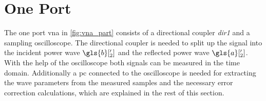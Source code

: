 \documentclass[12pt,a4paper,parskip=full,abstract=true,BCOR=12mm]{scrreprt}
\def\device#1{\mbox{\textit{#1}}}
\begin{document}

\section{One Port }
\label{sec:vna}

The one port \gls{vna} in \cref{fig:vna_part} consists of a directional coupler
\device{dir1} and a sampling oscilloscope. The directional coupler is needed to split up
the signal into the incident power wave $\gls{b}['_{2}]$ and the reflected power
wave $\gls{a}['_{2}]$. With the help of the oscilloscope both signals can be measured in the
time domain. Additionally a \gls{pc} connected to the oscilloscope is needed
for extracting the wave parameters from the measured samples and the necessary
error correction calculations, which are explained in the rest of this section.
\end{document}
